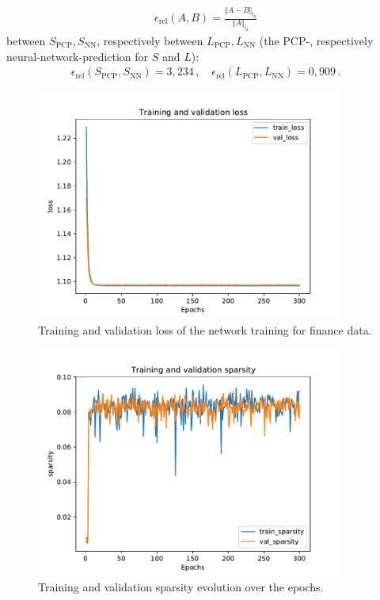 \begin{align}
\epsilon_\text{rel}(A,B) = \frac{\Vert A - B \Vert_{l_2}}{\Vert A \Vert_{l_2}}
\end{align}
between $S_\text{PCP}, S_\text{NN}$, respectively between $L_\text{PCP}, L_\text{NN}$ (the PCP-, respectively neural-network-prediction for $S$ and $L$):
\begin{align}
\epsilon_\text{rel}(S_\text{PCP},S_\text{NN}) = 3,234\,, \quad  \epsilon_\text{rel}(L_\text{PCP},L_\text{NN}) = 0,909 \,.
\end{align}
\begin{figure}
	\centering
	\includegraphics[width=0.9\textwidth]{fig/loss_finance.pdf}
	\caption{Training and validation loss of the network training for finance data.}
	\label{fig:finance_training}
\end{figure}
\begin{figure}
	\centering
	\includegraphics[width=0.9\textwidth]{fig/sparsity_finance.pdf}
	\caption{Training and validation sparsity evolution over the epochs.}
	\label{fig:finance_sparsity}
\end{figure}
